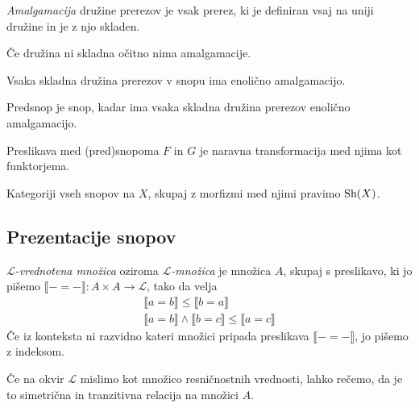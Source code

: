 \begin{definicija} %
  \emph{Amalgamacija} družine prerezov je vsak prerez, ki je definiran vsaj na
  uniji družine in je z njo skladen.
\end{definicija}

\begin{opomba}
  Če družina ni skladna očitno nima amalgamacije.
\end{opomba}
\begin{slogan}
  Vsaka skladna družina prerezov v snopu ima enolično amalgamacijo.
\end{slogan}
\begin{slogan}
  Predsnop je snop, kadar ima vsaka skladna družina prerezov enolično amalgamacijo.
\end{slogan}

\begin{definicija}
  Preslikava med (pred)snopoma \(F\) in \(G\) je naravna transformacija med
  njima kot funktorjema.
\end{definicija}

\begin{definicija}
  Kategoriji vseh snopov na \(X\), skupaj z morfizmi med njimi pravimo \(\textrm{Sh}{\left( X \right)}\).
\end{definicija}


\subsection{Prezentacije snopov}

\begin{definicija}
  \emph{\(ℒ\)-vrednotena množica} oziroma \emph{\(ℒ\)-množica} je množica \(A\),
  skupaj s preslikavo, ki jo pišemo \(⟦- = -⟧ : A×A → ℒ\), tako da velja
  \begin{align*}
    ⟦ a = b ⟧ ≤ ⟦ b = a ⟧\\
    ⟦ a = b ⟧ ∧ ⟦ b = c ⟧ ≤ ⟦ a = c ⟧
  \end{align*}
  Če iz konteksta ni razvidno kateri množici pripada preslikava \(⟦- = -⟧\),
  jo pišemo z indeksom.
\end{definicija}

Če na okvir \(ℒ\) mislimo kot množico resničnostnih vrednosti, lahko rečemo, da
je to simetrična in tranzitivna relacija na množici \(A\).

